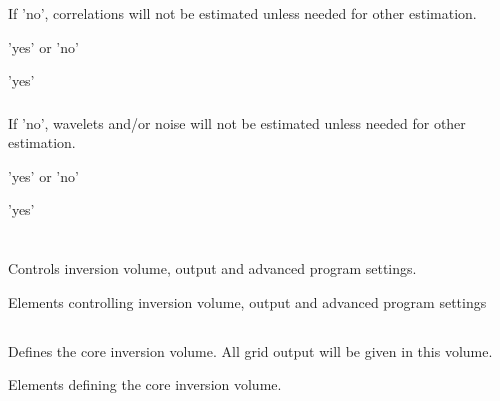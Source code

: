 \subsubsection{}  
 \slist
   \item \Description If 'no', correlations will not be estimated unless needed for other estimation.
   \item \Argument 'yes' or 'no'
   \item \Default 'yes'
 \elist

\subsubsection{}  
 \slist
   \item \Description If 'no', wavelets and/or noise will not be estimated unless needed for other estimation.
   \item \Argument 'yes' or 'no'
   \item \Default 'yes'
 \elist


 \section{\necessary} 
 \slist
   \item \Description Controls inversion volume, output and advanced program settings.
   \item \Argument Elements controlling inversion volume, output and advanced program settings
   \item \Default
 \elist

\subsection{\necessary} 
 \slist
   \item \Description Defines the core inversion volume. All grid output will be given in this volume.
   \item \Argument Elements defining the core inversion volume.
   \item \Default
 \elist

